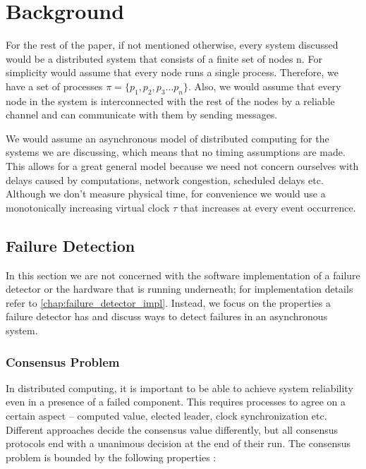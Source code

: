 \documentclass[bsc,frontabs,twoside,singlespacing,parskip,deptreport,hidel]{infthesis}     %
\begin{document}
\chapter{Background}
\label{chap:background}
For the rest of the paper, if not mentioned otherwise, every system discussed would be a distributed system that consists of a finite set of nodes n. For simplicity would assume that every node runs a single process. Therefore, we have a set of processes $\pi = \{p_1, p_2, p_3 \dots p_n\}$. Also, we would assume that every node in the system is interconnected with the rest of the nodes by a reliable channel and can communicate with them by sending messages. 

We would assume an asynchronous model of distributed computing for the systems we are discussing, which means that no timing assumptions are made. This allows for a great general model because we need not concern ourselves with delays caused by computations, network congestion, scheduled delays etc. Although we don't measure physical time, for convenience we would use a monotonically increasing virtual clock $\tau$ that increases at every event occurrence.


\section{Failure Detection}
\label{sec:failure_detection}
In this section we are not concerned with the software implementation of a failure detector or the hardware that is running underneath; for implementation details refer to \autoref{chap:failure_detector_impl}. Instead, we focus on the properties a failure detector has and discuss ways to detect failures in an asynchronous system.

\subsection{Consensus Problem}

In distributed computing, it is important to be able to achieve system reliability even in a presence of a failed component. This requires processes to agree on a certain aspect – computed value, elected leader, clock synchronization etc. Different approaches decide the consensus value differently, but all consensus protocols end with a unanimous decision at the end of their run.  The consensus problem is bounded by the following properties \cite{chandra1996unreliable}:
\end{document}
